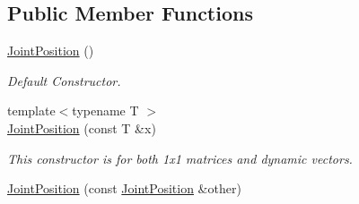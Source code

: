 \subsection*{Public Member Functions}
\begin{DoxyCompactItemize}
\item 
\hyperlink{classow__core_1_1JointPosition_a563520837683450f7ee71f7ba462868d}{Joint\+Position} ()\hypertarget{classow__core_1_1JointPosition_a563520837683450f7ee71f7ba462868d}{}\label{classow__core_1_1JointPosition_a563520837683450f7ee71f7ba462868d}

\begin{DoxyCompactList}\small\item\em Default Constructor. \end{DoxyCompactList}\item 
{\footnotesize template$<$typename T $>$ }\\\hyperlink{classow__core_1_1JointPosition_aa2fa47be6424a0da969e4f6c325c35d9}{Joint\+Position} (const T \&x)\hypertarget{classow__core_1_1JointPosition_aa2fa47be6424a0da969e4f6c325c35d9}{}\label{classow__core_1_1JointPosition_aa2fa47be6424a0da969e4f6c325c35d9}

\begin{DoxyCompactList}\small\item\em This constructor is for both 1x1 matrices and dynamic vectors. \end{DoxyCompactList}\item 
\hyperlink{classow__core_1_1JointPosition_a82cc7fc950e456315542e8e1712ca5a8}{Joint\+Position} (const \hyperlink{classow__core_1_1JointPosition}{Joint\+Position} \&other)\hypertarget{classow__core_1_1JointPosition_a82cc7fc950e456315542e8e1712ca5a8}{}\label{classow__core_1_1JointPosition_a82cc7fc950e456315542e8e1712ca5a8}


\end{DoxyCompactItemize}
